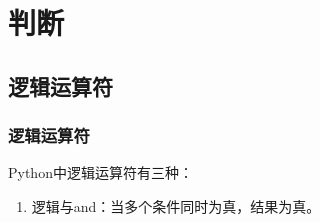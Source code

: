 \chapter{判断}

\section{逻辑运算符}

\subsection{逻辑运算符}

Python中逻辑运算符有三种：

\begin{enumerate}
    \item 逻辑与and：当多个条件同时为真，结果为真。
          \begin{table}[H]
              \centering
              \caption{逻辑与}
          \end{table}


\end{enumerate}
